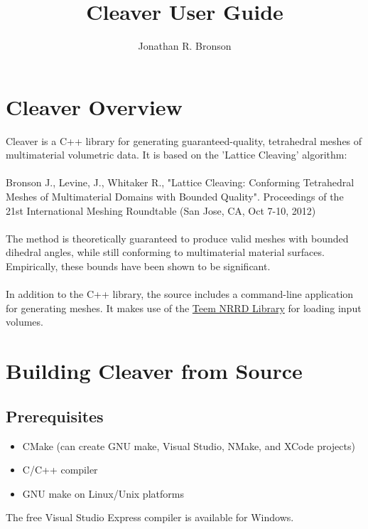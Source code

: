 \documentclass[fleqn,12pt,openany]{book}
\title{Cleaver User Guide}
\author{Jonathan R. Bronson}
\begin{document}


\maketitle

\chapter{Cleaver Overview}

Cleaver is a C++ library for generating guaranteed-quality, tetrahedral 
meshes of multimaterial volumetric data. It is based on the 'Lattice Cleaving' 
algorithm:\\
\\
Bronson J., Levine, J., Whitaker R., "Lattice Cleaving: Conforming Tetrahedral
Meshes of Multimaterial Domains with Bounded Quality". Proceedings of the 21st
International Meshing Roundtable (San Jose, CA, Oct 7-10, 2012) \\
\\
The method is theoretically guaranteed to produce valid meshes with bounded 
dihedral angles, while still conforming to multimaterial material surfaces. 
Empirically, these bounds have been shown to be significant.\\
\\
In addition to the C++ library, the source includes a command-line
application for generating meshes. It makes use of the 
\href{http://teem.sourceforge.net/nrrd/index.html}{Teem NRRD Library}
for loading input volumes.

\chapter{Building Cleaver from Source}

\section{Prerequisites}

\begin{itemize}
\item CMake (can create GNU make, Visual Studio, NMake, and XCode projects)
\item C/C++ compiler
\item GNU make on Linux/Unix platforms
\end{itemize}

The free Visual Studio Express compiler is available for Windows.
\end{document}
